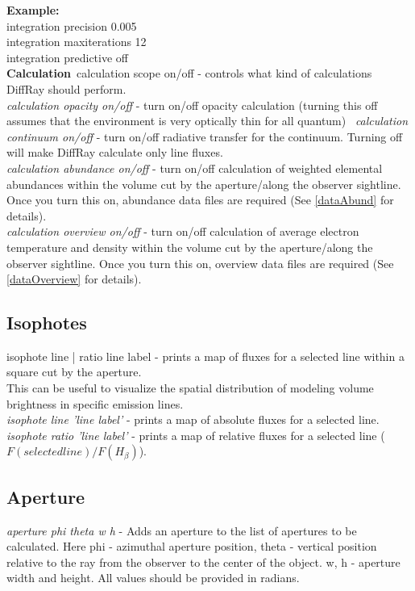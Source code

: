 \documentclass[a4paper]{article}
\begin{document}
{\bf Example:}\\
integration precision 0.005\\
integration maxiterations 12\\
integration predictive off\\

{\bf Calculation}\
calculation {scope} on/off - controls what kind of calculations DiffRay should perform. \\
    {\it calculation opacity on/off} - turn on/off opacity calculation (turning this off assumes that the environment is very optically thin for all
quantum) \
    {\it calculation continuum on/off} - turn on/off radiative transfer for the continuum. Turning off will make DiffRay calculate only line fluxes. \\
    {\it calculation abundance on/off} - turn on/off calculation of weighted elemental abundances within the volume cut by the aperture/along the observer sightline. Once you turn this on,
abundance data files are required (See \ref{dataAbund} for details). \\
    {\it calculation overview on/off} - turn on/off calculation of average electron temperature and density within the volume cut by the aperture/along the observer sightline. Once you turn this on,
overview data files are required (See \ref{dataOverview} for details). \\

\subsection{Isophotes}
isophote {line | ratio} {line label} - prints a map of fluxes for a selected line within a square cut by the aperture. \\
This can be useful to visualize the spatial distribution of modeling volume brightness in specific emission lines. \\
    {\it isophote line 'line label'} - prints a map of absolute fluxes for a selected line. \\
    {\it isophote ratio 'line label'} - prints a map of relative fluxes for a selected line ($F(selected line)/F(H_{\beta})$). \\

\subsection{Aperture}

{\it aperture phi theta w h} - Adds an aperture to the list of apertures to be calculated.
Here phi - azimuthal aperture position, theta - vertical position relative to the ray
from the observer to the center of the object. w, h - aperture width and height. All values
should be provided in radians.\
\end{document}
